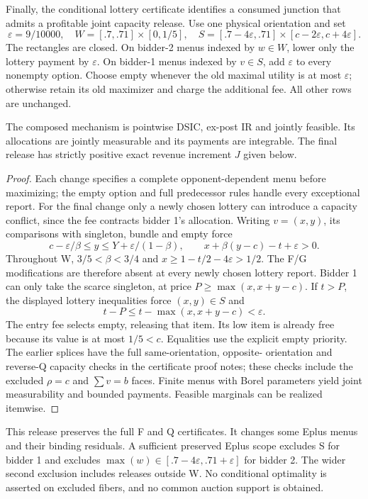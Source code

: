 Finally, the conditional lottery certificate identifies a consumed
junction that admits a profitable joint capacity release. Use one physical
orientation and set
\[
\varepsilon=9/10000,\quad
W=[.7,.71]\times[0,1/5],\quad
S=[.7-4\varepsilon,.71]\times[c-2\varepsilon,c+4\varepsilon].
\]
The rectangles are closed. On bidder-2 menus indexed by $w\in W$, lower
only the lottery payment by $\varepsilon$. On bidder-1 menus indexed by
$v\in S$, add $\varepsilon$ to every nonempty option. Choose empty whenever
the old maximal utility is at most $\varepsilon$; otherwise retain its old
maximizer and charge the additional fee. All other rows are unchanged.

\begin{proposition}\label{prop:joint-release}
The composed mechanism is pointwise DSIC, ex-post IR and jointly feasible.
Its allocations are jointly measurable and its payments are integrable. The final release has strictly positive
exact revenue increment $J$ given below.
\end{proposition}
\begin{proof}
Each change specifies a complete opponent-dependent menu before maximizing;
the empty option and full predecessor rules handle every exceptional report.
For the final change only a newly chosen lottery can introduce a capacity
conflict, since the fee contracts bidder 1's allocation. Writing $v=(x,y)$,
its comparisons with singleton, bundle and empty force
\[
c-\varepsilon/\beta\le y\le Y+\varepsilon/(1-\beta),\qquad
x+\beta(y-c)-t+\varepsilon>0.
\]
Throughout W, $3/5<\beta<3/4$ and
$x\ge1-t/2-4\varepsilon>1/2$. The F/G modifications are therefore absent
at every newly chosen lottery report. Bidder 1 can only take the scarce
singleton, at price $P\ge\max(x,x+y-c)$. If $t>P$, the displayed lottery
inequalities force $(x,y)\in S$ and
\[
t-P\le t-\max(x,x+y-c)<\varepsilon.
\]
The entry fee selects empty, releasing that item. Its low item is already
free because its value is at most $1/5<c$. Equalities use the explicit empty
priority. The earlier splices have the full same-orientation, opposite-
orientation and reverse-Q capacity checks in the certificate proof notes;
these checks include the excluded $\rho=c$ and $\sum v=b$ faces.
Finite menus with Borel parameters yield joint measurability and bounded
payments. Feasible marginals can be realized itemwise.
\end{proof}

This release preserves the full F and Q certificates. It changes some
Eplus menus and their binding residuals. A sufficient preserved Eplus scope
excludes S for bidder 1 and excludes
$\max(w)\in[.7-4\varepsilon,.71+\varepsilon]$ for bidder 2. The wider
second exclusion includes releases outside W. No conditional optimality is
asserted on excluded fibers, and no common auction support is obtained.

